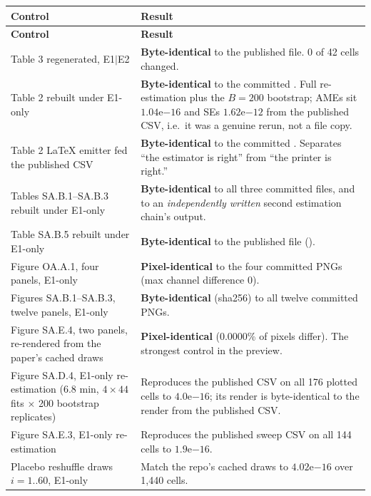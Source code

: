 \documentclass[10pt]{article}
\newcommand{\file}[1]{{\ttfamily\detokenize{#1}}}
\begin{document}
{\footnotesize
\begin{longtable}{@{}p{6.2cm}p{14.5cm}@{}}
\toprule
\textbf{Control} & \textbf{Result} \\
\midrule
\endfirsthead
\toprule
\textbf{Control} & \textbf{Result} \\
\midrule
\endhead
Table 3 regenerated, E1$|$E2 & \textcolor{okcol}{\bfseries Byte-identical} to the published file. 0 of 42 cells changed. \\
Table 2 rebuilt under E1-only & \textcolor{okcol}{\bfseries Byte-identical} to the committed \file{.tex}. Full re-estimation plus the $B=200$ bootstrap; AMEs sit $1.04\mathrm{e}{-16}$ and SEs $1.62\mathrm{e}{-12}$ from the published CSV, i.e.\ it was a genuine rerun, not a file copy. \\
Table 2 \LaTeX{} emitter fed the published CSV & \textcolor{okcol}{\bfseries Byte-identical} to the committed \file{.tex}. Separates ``the estimator is right'' from ``the printer is right.'' \\
Tables SA.B.1--SA.B.3 rebuilt under E1-only & \textcolor{okcol}{\bfseries Byte-identical} to all three committed \file{.tex} files, and to an \emph{independently written} second estimation chain's output. \\
Table SA.B.5 rebuilt under E1-only & \textcolor{okcol}{\bfseries Byte-identical} to the published file (\file{md5 30c3f1b3576a465fc4a37c0cb9eb7cd9}). \\
Figure OA.A.1, four panels, E1-only & \textcolor{okcol}{\bfseries Pixel-identical} to the four committed PNGs (max channel difference 0). \\
Figures SA.B.1--SA.B.3, twelve panels, E1-only & \textcolor{okcol}{\bfseries Byte-identical} (sha256) to all twelve committed PNGs. \\
Figure SA.E.4, two panels, re-rendered from the paper's cached draws & \textcolor{okcol}{\bfseries Pixel-identical} (0.0000\% of pixels differ). The strongest control in the preview. \\
Figure SA.D.4, E1-only re-estimation (6.8 min, $4\times44$ fits $\times$ 200 bootstrap replicates) & Reproduces the published CSV on all 176 plotted cells to $4.0\mathrm{e}{-16}$; its render is byte-identical to the render from the published CSV. \\
Figure SA.E.3, E1-only re-estimation & Reproduces the published sweep CSV on all 144 cells to $1.9\mathrm{e}{-16}$. \\
Placebo reshuffle draws $i=1..60$, E1-only & Match the repo's cached draws to $4.02\mathrm{e}{-16}$ over 1,440 cells. \\

\end{longtable}}
\end{document}
